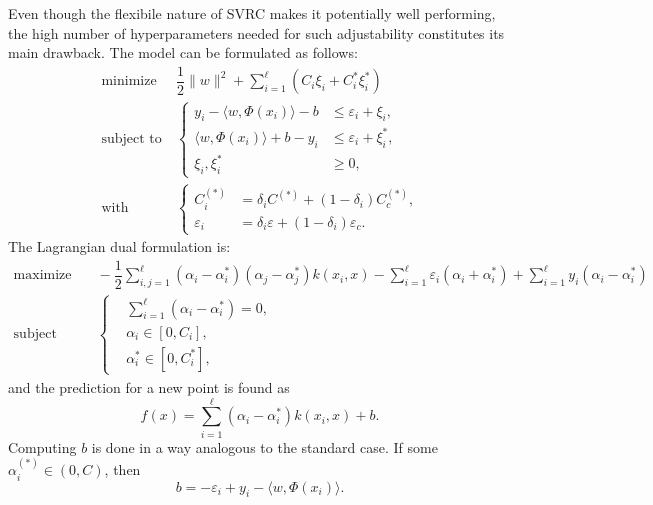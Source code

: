 \documentclass[12pt]{report}
\begin{document}
Even though the flexibile nature of SVRC makes it potentially well performing, the high number of hyperparameters needed for such adjustability constitutes its main drawback. The model can be formulated as follows:
\begin{equation} \label{svrcprimal}
\begin{split}
\text{minimize} &\ \dfrac{1}{2}\| w \|^2 + \sum_{i=1}^{\ell}(C_{i}\xi_{i} + C_{i}^{*}\xi_{i}^{*}) \\
\text{subject to} &\ \begin{cases}
y_{i} - \langle w,\Phi(x_{i}) \rangle - b &\leq \varepsilon_{i} + \xi_{i} \text{,}\\
\langle w,\Phi(x_{i}) \rangle + b - y_{i} &\leq \varepsilon_{i} + \xi_{i}^{*} \text{,}\\
\xi_{i}, \xi_{i}^{*} &\geq 0 \text{,}
\end{cases}\\
\text{with} &\
\begin{cases}
C_{i}^{(*)} &= \delta_{i}C^{(*)} + (1-\delta_{i})C_{c}^{(*)} \text{,}\\
\varepsilon_{i} &= \delta_{i}\varepsilon + (1-\delta_{i})\varepsilon_{c} \text{.}
\end{cases}
\end{split}
\end{equation}
The Lagrangian dual formulation is:
\begin{equation} \label{svrcdual}
\begin{split}
\text{maximize} &\quad
-\dfrac{1}{2}\sum_{i,j=1}^{\ell}(\alpha_{i} - \alpha_{i}^{*})(\alpha_{j} - \alpha_{j}^{*})k(x_{i},x) -\sum_{i=1}^{\ell}\varepsilon_{i}(\alpha_{i} + \alpha_{i}^{*}) + \sum_{i=1}^{\ell}y_{i}(\alpha_{i}-\alpha_{i}^{*}) \\
\text{subject to} &\quad \left\{\begin{split}
&\sum_{i=1}^{\ell}(\alpha_{i} - \alpha_{i}^{*}) = 0 \text{,}\\
&\alpha_{i} \in [0,C_{i}] \text{,} \\
&\alpha_{i}^{*} \in [0,C_{i}^{*}] \text{,}
\end{split}\right.
\end{split}
\end{equation}
and the prediction for a new point is found as
\begin{equation} \label{svrcf}
f(x) = \sum_{i=1}^{\ell}(\alpha_{i}-\alpha_{i}^{*})k(x_{i},x) + b \text{.}
\end{equation}
Computing $b$ is done in a way analogous to the standard case. If some $\alpha_{i}^{(*)} \in (0,C)$, then
\begin{equation} \label{svrccompb3}
b = - \varepsilon_{i} + y_{i} - \langle w,\Phi(x_{i})\rangle \text{.}
\end{equation}
\end{document}
